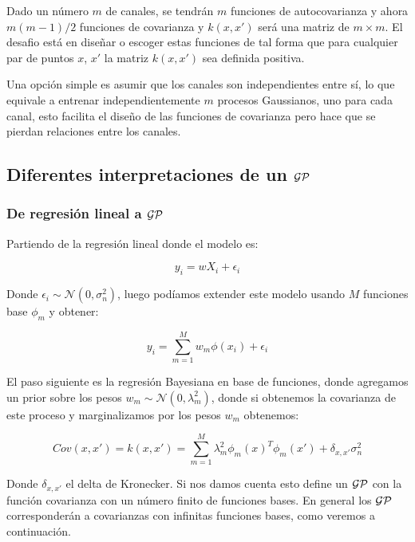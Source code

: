 Dado un número $m$ de canales, se tendrán $m$ funciones de autocovarianza y ahora $m(m-1)/2$ funciones de covarianza y $k(x, x')$ será una matriz de $m\times m$. El desafio está en diseñar o escoger estas funciones de tal forma que para cualquier par de puntos $x$, $x'$ la matriz $k(x, x')$ sea definida positiva.

Una opción simple es asumir que los canales son independientes entre sí, lo que equivale a entrenar independientemente $m$ procesos Gaussianos, uno para cada canal, esto facilita el diseño de las funciones de covarianza pero hace que se pierdan relaciones entre los canales.
 

\subsection{Diferentes interpretaciones de un \texorpdfstring{$\mathcal{GP}$}{GP}}

\subsubsection{De regresión lineal a \texorpdfstring{$\mathcal{GP}$}{GP}}

Partiendo de la regresión lineal donde el modelo es:

\begin{equation}
	y_i = w X_i + \epsilon_i
\end{equation}

Donde $\epsilon_i \sim \mathcal{N}(0, \sigma_n^2)$, luego podíamos extender este modelo usando $M$ funciones base $\phi_m$ y obtener:

\begin{equation}
	y_i = \sum_{m=1}^{M} w_m \phi(x_i) + \epsilon_i
\end{equation}

El paso siguiente es la regresión Bayesiana en base de funciones, donde agregamos un prior sobre los pesos $w_m \sim \mathcal{N}(0, \lambda_m^2)$, donde si obtenemos la covarianza de este proceso y marginalizamos por los pesos $w_m$ obtenemos:

\begin{equation}
	Cov(x, x') = k(x, x') = \sum_{m=1}^{M} \lambda_m^2 \phi_m(x)^T\phi_m(x') + \delta_{x, x'} \sigma_n^2
\end{equation}

Donde $\delta_{x, x'}$ el delta de Kronecker. Si nos damos cuenta esto define un $\mathcal{GP}$ con la función covarianza con un número finito de funciones bases. En general los $\mathcal{GP}$ corresponderán a covarianzas con infinitas funciones bases, como veremos a continuación.\\


